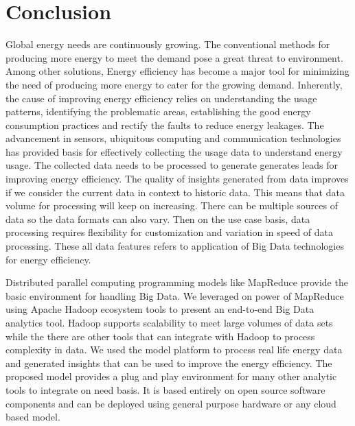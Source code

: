 \chapter{Conclusion}
\label{chapter:concluion}

Global energy needs are continuously growing. The conventional methods for producing more energy to meet the demand pose a great threat to environment. Among other solutions, Energy efficiency has become a major tool for minimizing the need of producing more energy to cater for the growing demand. Inherently, the cause of improving energy efficiency relies on understanding the usage patterns, identifying the problematic areas, establishing the good energy consumption practices and rectify the faults to reduce energy leakages. The advancement in sensors, ubiquitous computing  and communication technologies has provided basis for effectively collecting the usage data to understand energy usage. The collected data needs to be processed to generate generates leads for improving energy efficiency. The quality of insights generated from data improves if we consider the current data in context to historic data. This means that data volume for processing will keep on increasing. There can be multiple sources of data so the data formats can also vary. Then on the use case basis, data processing requires flexibility for customization and variation in speed of data processing. These all data features refers to application of Big Data technologies for energy efficiency. 

Distributed parallel computing programming models like MapReduce provide the basic environment for handling Big Data. We leveraged on power of MapReduce using Apache Hadoop ecosystem tools to present an end-to-end Big Data analytics tool. Hadoop supports scalability to meet large volumes of data sets while the there are other tools that can integrate with Hadoop to process complexity in data. We used the model platform to process real life energy data and generated insights that can be used to improve the energy efficiency. The proposed model provides a plug and play environment for many other analytic tools to integrate on need basis. It is based entirely on open source software components and can be deployed using general purpose hardware or any cloud based model.

